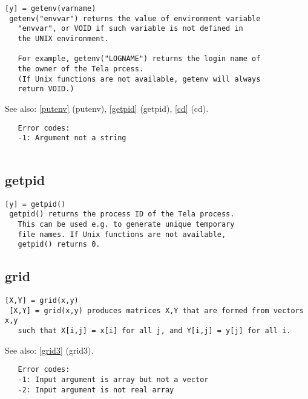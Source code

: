 \documentclass[a4paper]{article}
\begin{document}
\begin{tscreen}
\begin{verbatim}
[y] = getenv(varname)
 getenv("envvar") returns the value of environment variable
   "envvar", or VOID if such variable is not defined in
   the UNIX environment.

   For example, getenv("LOGNAME") returns the login name of
   the owner of the Tela prcess.
   (If Unix functions are not available, getenv will always
   return VOID.)
\end{verbatim}

See also: \ref{putenv} {(putenv)}, \ref{getpid} {(getpid)}, \ref{cd} {(cd)}.
\begin{verbatim}
   Error codes:
   -1: Argument not a string
   
\end{verbatim}
\end{tscreen}





\subsection{getpid\label{getpid}}

\begin{tscreen}
\begin{verbatim}
[y] = getpid()
 getpid() returns the process ID of the Tela process.
   This can be used e.g. to generate unique temporary
   file names. If Unix functions are not available,
   getpid() returns 0. 
\end{verbatim}
\end{tscreen}





\subsection{grid\label{grid}}

\begin{tscreen}
\begin{verbatim}
[X,Y] = grid(x,y)
 [X,Y] = grid(x,y) produces matrices X,Y that are formed from vectors x,y
   such that X[i,j] = x[i] for all j, and Y[i,j] = y[j] for all i.
\end{verbatim}

See also: \ref{grid3} {(grid3)}.
\begin{verbatim}
   Error codes:
   -1: Input argument is array but not a vector
   -2: Input argument is not real array 
\end{verbatim}
\end{tscreen}
\end{document}
